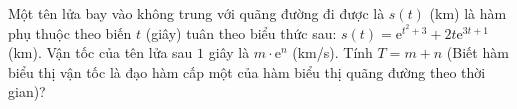 \begin{bt}%
		Một tên lửa bay vào không trung với quãng đường đi được là $s(t)$ (km) là hàm phụ thuộc theo biến  $t$ (giây) tuân theo biểu thức sau: $s(t)=\mathrm{e}^{t^2+3}+2t{\mathrm{e}^{3t+1}}$ (km). Vận tốc của tên lửa sau $1$ giây là $m\cdot \mathrm{e}^n$ (km/s). Tính $T=m+n$ (Biết hàm biểu thị vận tốc là đạo hàm cấp một của hàm biểu thị quãng đường theo thời gian)?
	\end{bt}

